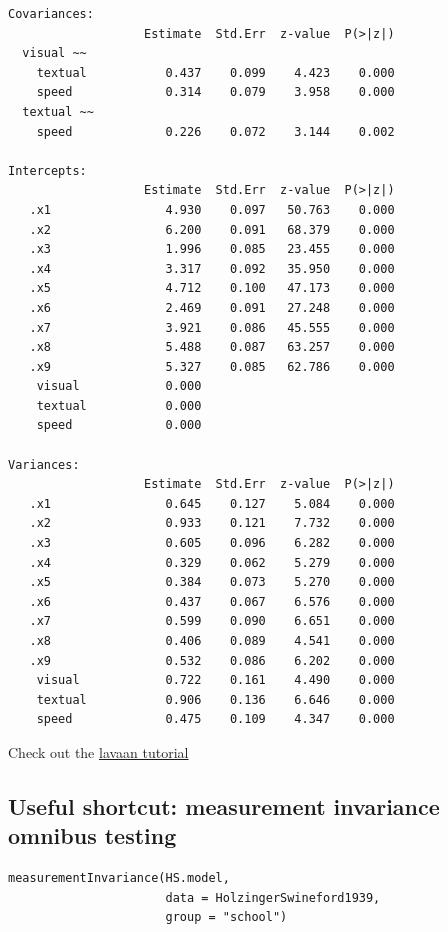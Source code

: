 \documentclass[
]{book}
\begin{document}
\begin{verbatim}
Covariances:
                   Estimate  Std.Err  z-value  P(>|z|)
  visual ~~                                           
    textual           0.437    0.099    4.423    0.000
    speed             0.314    0.079    3.958    0.000
  textual ~~                                          
    speed             0.226    0.072    3.144    0.002

Intercepts:
                   Estimate  Std.Err  z-value  P(>|z|)
   .x1                4.930    0.097   50.763    0.000
   .x2                6.200    0.091   68.379    0.000
   .x3                1.996    0.085   23.455    0.000
   .x4                3.317    0.092   35.950    0.000
   .x5                4.712    0.100   47.173    0.000
   .x6                2.469    0.091   27.248    0.000
   .x7                3.921    0.086   45.555    0.000
   .x8                5.488    0.087   63.257    0.000
   .x9                5.327    0.085   62.786    0.000
    visual            0.000                           
    textual           0.000                           
    speed             0.000                           

Variances:
                   Estimate  Std.Err  z-value  P(>|z|)
   .x1                0.645    0.127    5.084    0.000
   .x2                0.933    0.121    7.732    0.000
   .x3                0.605    0.096    6.282    0.000
   .x4                0.329    0.062    5.279    0.000
   .x5                0.384    0.073    5.270    0.000
   .x6                0.437    0.067    6.576    0.000
   .x7                0.599    0.090    6.651    0.000
   .x8                0.406    0.089    4.541    0.000
   .x9                0.532    0.086    6.202    0.000
    visual            0.722    0.161    4.490    0.000
    textual           0.906    0.136    6.646    0.000
    speed             0.475    0.109    4.347    0.000

\end{verbatim}

Check out the \href{https://lavaan.ugent.be/tutorial/before.html}{lavaan tutorial}

\hypertarget{useful-shortcut-measurement-invariance-omnibus-testing}{%
\subsection{Useful shortcut: measurement invariance omnibus testing}\label{useful-shortcut-measurement-invariance-omnibus-testing}}

\begin{verbatim}
measurementInvariance(HS.model, 
                      data = HolzingerSwineford1939, 
                      group = "school")
\end{verbatim}
\end{document}
